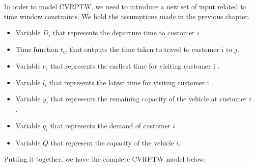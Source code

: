 In order to model CVRPTW, we need to introduce a new set of input related to time window constraints. We hold the assumptions made in the previous chapter.
\begin{itemize}
\item Variable \(D_{i}\) that represents the departure time to customer \(i\).
\item Time function \(t_{ij}\) that outputs the time taken to travel to customer \(i\) to \(j\).
\item Variable \(e_{i}\) that represents the earliest time for visiting customer i .
\item Variable \(l_{i}\) that represents the latest time for visiting customer i .
\item Variable \(y_{i}\) that represents the remaining capacity of the vehicle at customer \(i\) .
\item Variable \(q_{i}\) that represents the demand of customer \(i\) .
\item Variable \(Q\) that represent the capacity of the vehicle \(i\).
\end{itemize}
Putting it together, we have the complete CVRPTW model below:

\vspace{0.5cm}

